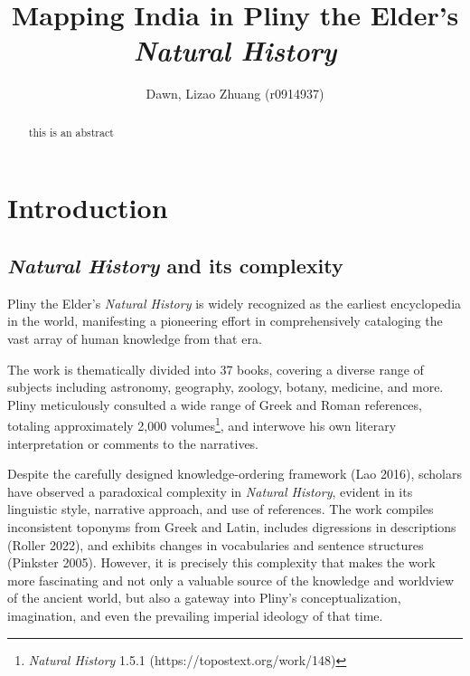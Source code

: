 \documentclass[
  12pt,
]{article}
\title{Mapping India in Pliny the Elder's \emph{Natural History}}
\author{Dawn, Lizao Zhuang (r0914937)}
\date{}
\renewcommand*\contentsname{Table of contents}
\newcommand\contentsname{Table of contents}
\begin{document}
\maketitle
\begin{abstract}
this is an abstract
\end{abstract}
\ifdefined\Shaded\renewenvironment{Shaded}{\begin{tcolorbox}[frame hidden, enhanced, borderline west={3pt}{0pt}{shadecolor}, interior hidden, boxrule=0pt, sharp corners, breakable]}{\end{tcolorbox}}\fi

\renewcommand*\contentsname{Table of Contents}
{
\hypersetup{linkcolor=}
\setcounter{tocdepth}{3}
\tableofcontents
}
\listoffigures
\listoftables
{}
\clearpage
\pagestyle{plain}
\setcounter{page}{1}

\hypertarget{sec-introduction}{%
\section{Introduction}\label{sec-introduction}}

\hypertarget{natural-history-and-its-complexity}{%
\subsection{\texorpdfstring{\emph{Natural History} and its
complexity}{Natural History and its complexity}}\label{natural-history-and-its-complexity}}

Pliny the Elder's \emph{Natural History} is widely recognized as the
earliest encyclopedia in the world, manifesting a pioneering effort in
comprehensively cataloging the vast array of human knowledge from that
era.

The work is thematically divided into 37 books, covering a diverse range
of subjects including astronomy, geography, zoology, botany, medicine,
and more. Pliny meticulously consulted a wide range of Greek and Roman
references, totaling approximately 2,000 volumes\footnote{\emph{Natural
  History} 1.5.1 (https://topostext.org/work/148)}, and interwove his
own literary interpretation or comments to the narratives.

Despite the carefully designed knowledge-ordering framework (Lao 2016),
scholars have observed a paradoxical complexity in \emph{Natural
History}, evident in its linguistic style, narrative approach, and use
of references. The work compiles inconsistent toponyms from Greek and
Latin, includes digressions in descriptions (Roller 2022), and exhibits
changes in vocabularies and sentence structures (Pinkster 2005).
However, it is precisely this complexity that makes the work more
fascinating and not only a valuable source of the knowledge and
worldview of the ancient world, but also a gateway into Pliny's
conceptualization, imagination, and even the prevailing imperial
ideology of that time.
\end{document}
